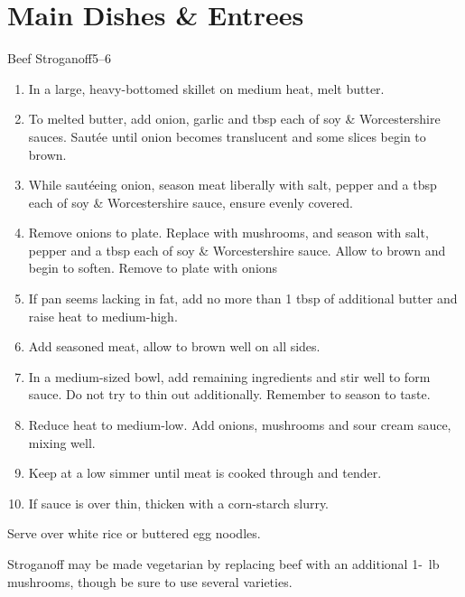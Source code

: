 \chapter{Main Dishes \& Entrees}
\label{cha:mains-entrees}

\begin{recipe}{Beef Stroganoff}{}{5--6}
  \begin{ingredients}
  \end{ingredients}
  \begin{enumerate}
  \item In a large, heavy-bottomed skillet on medium heat, melt
    butter.
  \item To melted butter, add onion, garlic and tbsp each of soy \&
    Worcestershire sauces.  Saut\'ee until onion becomes translucent
    and some slices begin to brown.
  \item While saut\'eeing onion, season meat liberally with salt,
    pepper and a tbsp each of soy \& Worcestershire sauce, ensure
    evenly covered.
  \item Remove onions to plate.  Replace with mushrooms, and season
    with salt, pepper and a tbsp each of soy \& Worcestershire sauce.
    Allow to brown and begin to soften.  Remove to plate with onions
  \item If pan seems lacking in fat, add no more than 1 tbsp of
    additional butter and raise heat to medium-high.
  \item Add seasoned meat, allow to brown well on all sides.
  \item In a medium-sized bowl, add remaining ingredients and stir
    well to form sauce.  Do not try to thin out additionally.
    Remember to season to taste.
  \item Reduce heat to medium-low.  Add onions, mushrooms and sour
    cream sauce, mixing well.
  \item Keep at a low simmer until meat is cooked through and tender.
  \item If sauce is over thin, thicken with a corn-starch slurry.
  \end{enumerate}
  Serve over white rice or buttered egg noodles.
  \begin{note}
    Stroganoff may be made vegetarian by replacing beef with an
    additional 1-\half~lb mushrooms, though be sure to use several
    varieties.
  \end{note}
\end{recipe}


